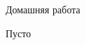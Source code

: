 \begin{homework}[number=3]
	\begin{listofex}
		\item Домашняя работа
	\end{listofex}
\end{homework}

\begin{class}[number=4]
	\begin{listofex}
		\item Пусто
	\end{listofex}
\end{class}
